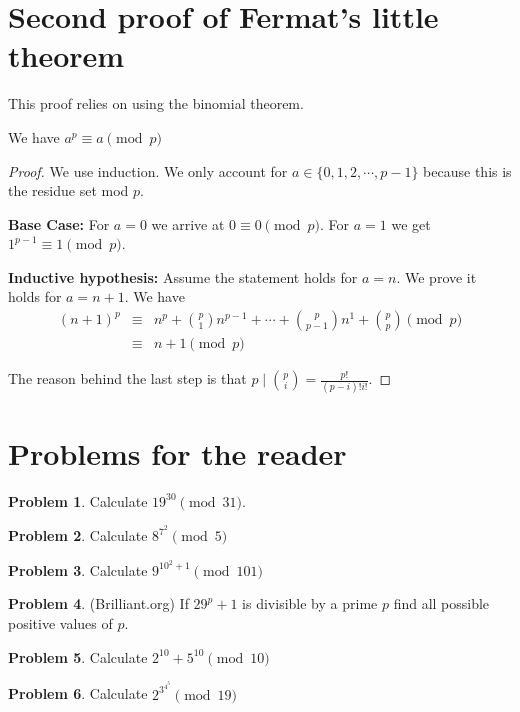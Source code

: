 \documentclass[12pt,openany]{book}
\theoremstyle{definition}
\newtheorem{prob}{Problem}[section]
\theoremstyle{definition}
\begin{document}
\section{Second proof of Fermat's little theorem}

This proof relies on using the binomial theorem.     

\begin{thm}  We have $a^p\equiv a\pmod{p}$ \end{thm}

\begin{proof}  We use induction. We only account for $a\in \{0,1,2,\cdots, p-1\}$ because this is the residue set mod $p$.

\textbf{Base Case:}  For $a=0$ we arrive at $0\equiv 0\pmod{p}$. For $a=1$ we get $1^{p-1}\equiv 1\pmod{p}$.  

\textbf{Inductive hypothesis:}  Assume the statement holds for $a=n$.  We prove it holds for $a=n+1$.  We have \begin{eqnarray*} \left(n+1\right)^p&\equiv& n^p+\binom{p}{1}n^{p-1}+\cdots+\binom{p}{p-1}n^1+\binom{p}{p}\pmod{p} \\ &\equiv& n+1\pmod{p} \end{eqnarray*} 

The reason behind the last step is that $p\mid \binom{p}{i}=\frac{p!}{\left(p-i\right)!i!}$.  \end{proof}
 
\section{Problems for the reader}
\begin{prob}  Calculate $19^{30}\pmod{31}$.\end{prob}
\begin{prob}  Calculate $8^{7^{2}}\pmod{5}$ \end{prob}
\begin{prob}  Calculate $9^{10^2+1}\pmod{101}$ \end{prob}
\begin{prob}(Brilliant.org)  If $29^p+1$ is divisible by a prime $p$ find all possible positive values of $p$. \end{prob}
\begin{prob}  Calculate $2^{10}+5^{10}\pmod{10}$ \end{prob}  
\begin{prob}  Calculate $2^{3^{4^{5}}}\pmod{19}$  \end{prob} 
\end{document}
